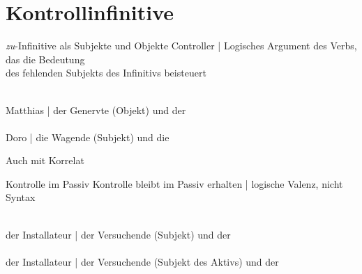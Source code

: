 \section{Kontrollinfinitive}

\begin{frame}
  {\textit{zu}-Infinitive als Subjekte und Objekte}
  \onslide<+->
  \onslide<+->
  \alert{Controller} | Logisches Argument des Verbs, das die Bedeutung\\
  des fehlenden Subjekts des Infinitivs beisteuert\\
  \onslide<+->
  \Halbzeile
  \begin{exe}
  \ex\label{ex:infinitivkontrolle264}
  \begin{xlist}
    \\
    \onslide<+->
    \Viertelzeile
    Matthias | der \alert{Genervte} (Objekt) und der \\
    \Halbzeile
    \onslide<+->
    \\
    \onslide<+->
    \Viertelzeile
    Doro | die \alert{Wagende} (Subjekt) und die 
  \end{xlist}
\end{exe}
\Zeile
\onslide<+->
Auch mit Korrelat\\
\Halbzeile
\begin{exe}
  \ex\label{ex:infinitivkontrolle267}
  \begin{xlist}
  \end{xlist}
\end{exe}
\end{frame}

\begin{frame}
  {Kontrolle im Passiv}
  \onslide<+->
  \onslide<+->
  Kontrolle bleibt im Passiv erhalten | \alert{logische Valenz}, nicht Syntax\\
  \Halbzeile
  \onslide<+->
  \begin{exe}
  \ex\label{ex:infinitivkontrolle270}
  \begin{xlist}
    \\
    \onslide<+->
    \Viertelzeile
    der Installateur | der \alert{Versuchende} (Subjekt) und der \\
    \onslide<+->
    \Halbzeile
    \\
    \Viertelzeile
    \onslide<+->
    der Installateur | der \alert{Versuchende} (Subjekt des Aktivs) und der \\
  \end{xlist}
\end{exe}
\end{frame}

